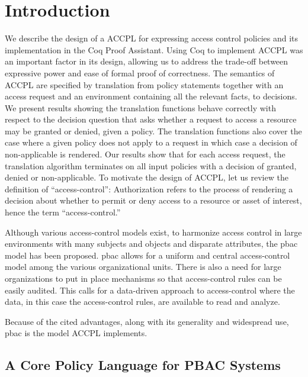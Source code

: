 \documentclass[runningheads,a4paper]{llncs}
\begin{document}

\section{Introduction}\label{sec:intro}
We describe the design of a \ac{ACCPL} 
for expressing access control policies
%
and its implementation in the
Coq Proof Assistant. Using Coq to implement \ac{ACCPL} was an
important factor in its design, allowing us to address the trade-off
between expressive power and ease of formal proof of correctness.
The semantics of \ac{ACCPL} are specified by translation from policy
statements together with an access request and an environment
containing all the relevant facts, to decisions. We present results
showing the translation functions behave correctly with respect to the
decision question that asks whether a request to access a resource may
be granted or denied, given a policy. The translation functions also
cover the case where a given policy does not apply to a request in
which case a decision of non-applicable is rendered. Our results show
that for each access request, the translation algorithm terminates on
all input policies with a decision of granted, denied or
non-applicable.
To motivate the design of \ac{ACCPL}, let us review the definition of
``access-control'': Authorization refers to the process of rendering a
decision about whether to permit or deny access to a resource or asset
of interest, hence the term ``access-control.''

Although various access-control models exist, to harmonize access control in large environments with many subjects and objects and disparate attributes, the \ac{pbac}~\cite{nist} model has been proposed. \ac{pbac} allows for a uniform and central access-control model among the various organizational units. There is also a need for large organizations to put in place mechanisms so that access-control rules can be easily audited. This calls for a data-driven approach to access-control where the data, in this case the access-control rules, are available to read and analyze. 


Because of the cited advantages, along with its generality and
widespread use, \ac{pbac} is the model \ac{ACCPL} implements.

\subsection{A Core Policy Language for PBAC Systems} 
\end{document}
